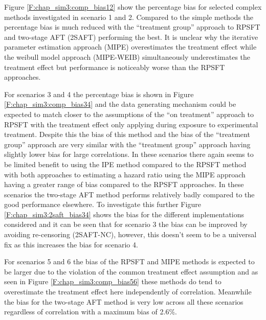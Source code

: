 Figure \ref{F:chap_sim3:comp_bias12} show the percentage bias for selected complex methods investigated in scenario 1 and 2. Compared to the simple methods the percentage bias is much reduced with the ``treatment group'' approach to RPSFT and two-stage AFT (2SAFT) performing the best. It is unclear why the iterative parameter estimation approach (MIPE) overestimates the treatment effect while the weibull model approach (MIPE-WEIB) simultaneously underestimates the treatment effect but performance is noticeably worse than the RPSFT approaches. 


For scenarios 3 and 4 the percentage bias is shown in Figure \ref{F:chap_sim3:comp_bias34} and the data generating mechanism could be expected to match closer to the assumptions of the ``on treatment'' approach to RPSFT with the treatment effect only applying during exposure to experimental treatment. Despite this the bias of this method and the bias of the ``treatment group'' approach are very similar with the ``treatment group'' approach having slightly lower bias for large correlations. In these scenarios there again seems to be limited benefit to using the IPE method compared to the RPSFT method with both approaches to estimating a hazard ratio using the MIPE approach having a greater range of bias compared to the RPSFT approaches. In these scenarios the two-stage AFT method performs relatively badly compared to the good performance elsewhere. To investigate this further Figure \ref{F:chap_sim3:2saft_bias34} shows the bias for the different implementations considered and it can be seen that for scenario 3 the bias can be improved by avoiding re-censoring (2SAFT-NC), however, this doesn't seem to be a universal fix as this increases the bias for scenario 4.

For scenarios 5 and 6 the bias of the RPSFT and MIPE methods is expected to be larger due to the violation of the common treatment effect assumption and as seen in Figure \ref{F:chap_sim3:comp_bias56} these methods do tend to overestimate the treatment effect here independently of correlation. Meanwhile the bias for the two-stage AFT method is very low across all these scenarios regardless of correlation with a maximum bias of 2.6\%.


